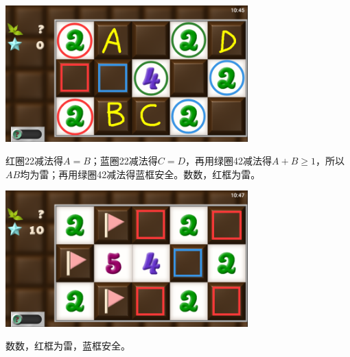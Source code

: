 \subsection{} %
\begin{center}
    \includegraphics[width=0.7\textwidth]{puzzle/120-1.png}
\end{center}
红圈22减法得$A=B$；蓝圈22减法得$C=D$，再用绿圈42减法得$A+B\ge 1$，所以$AB$均为雷；再用绿圈42减法得蓝框安全。数数，红框为雷。
\begin{center}
    \includegraphics[width=0.7\textwidth]{puzzle/120-2.png}
\end{center}
数数，红框为雷，蓝框安全。

